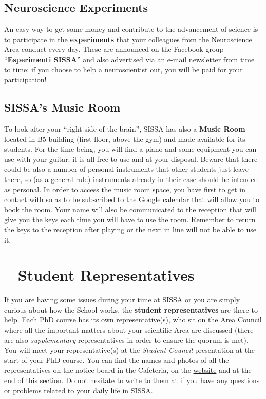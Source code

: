 \documentclass{sissavademecum}
\begin{document}
\section{Neuroscience Experiments}

An easy way to get some money and contribute to the advancement of science is to participate in the \textbf{experiments} that your colleagues from the Neuroscience Area conduct every day. These are announced on the Facebook group \href{https://www.facebook.com/groups/144096472323480}{``\textbf{Esperimenti SISSA}''} and also advertised via an e-mail newsletter from time to time; if you choose to help a neuroscientist out, you will be paid for your participation!


\section{SISSA's Music Room}

To look after your ``right side of the brain'', SISSA has also a \textbf{Music Room} located in B5 building (first floor, above the gym) and made available for its students. For the time being, you will find a piano and some equipment you can use with your guitar; it is all free to use and at your disposal. Beware that there could be also a number of personal instruments that other students just leave there, so (as a general rule) instruments already in their case should be intended as personal. In order to access the music room space, you have first to get in contact with  so as to be subscribed to the Google calendar that will allow you to book the room. Your name will also be communicated to the reception that will give you the keys each time you will have to use the room. Remember to return the keys to the reception after playing or the next in line will not be able to use it.




\chapter{\texorpdfstring{\faFlag\ }{} Student Representatives}

If you are having some issues during your time at SISSA or you are simply curious about how the School works, the \textbf{student representatives} are there to help. Each PhD course has its own representative(s), who sit on the Area Council where all the important matters about your scientific Area are discussed (there are also \textit{supplementary} representatives in order to ensure the quorum is met). You will meet your representative(s) at the \emph{Student Council} presentation at the start of your PhD course. You can find the names and photos of all the representatives on the notice board in the Cafeteria, on the \href{http://students.sissa.it/}{website} and at the end of this section. Do not hesitate to write to them at  if you have any questions or problems related to your daily life in SISSA.
\end{document}
